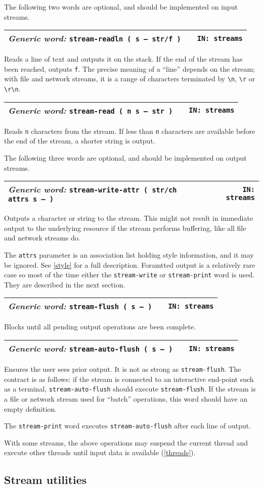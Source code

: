 \documentclass{report}
\newcommand{\genericword}[3]{\index{#1}
\emph{Generic word:} \texttt{#2} &&\texttt{IN: #3}}
\newcommand{\wordtable}[1]{

\begin{tabularx}{12cm}[t]{lXr}
\hline
#1\\
\hline
\end{tabularx}

}
\begin{document}
The following two words are optional, and should be implemented on input streams.
\wordtable{
\genericword{stream-readln}{stream-readln ( s -- str/f )}{streams}
}
Reads a line of text and outputs it on the stack. If the end of the stream has been reached, outputs \texttt{f}. The precise meaning of a ``line'' depends on the stream; with file and network streams, it is a range of characters terminated by \verb|\n|, \verb|\r| or \verb|\r\n|.
\wordtable{
\genericword{stream-read}{stream-read ( n s -- str )}{streams}
}
Reads \texttt{n} characters from the stream. If less than \texttt{n} characters are available before the end of the stream, a shorter string is output.

The following three words are optional, and should be implemented on output streams.

\wordtable{
\genericword{stream-write-attr}{stream-write-attr ( str/ch attrs s -- )}{streams}
}
Outputs a character or string to the stream. This might not result in immediate output to the underlying resource if the stream performs buffering, like all file and network streams do. 

The \texttt{attrs} parameter is an association list holding style information, and it may be ignored. See \ref{style} for a full description. Foramtted output is a relatively rare case so most of the time either the \texttt{stream-write} or \texttt{stream-print} word is used. They are described in the next section.

\wordtable{
\genericword{stream-flush}{stream-flush ( s -- )}{streams}
}
Blocks until all pending output operations are been complete.
\wordtable{
\genericword{stream-auto-flush}{stream-auto-flush ( s -- )}{streams}
}
Ensures the user sees prior output. It is not as strong as \texttt{stream-flush}. The contract is as follows: if the stream is connected to an interactive end-point such as a terminal, \texttt{stream-auto-flush} should execute \texttt{stream-flush}. If the stream is a file or network stream used for ``batch'' operations, this word should have an empty definition.

The \texttt{stream-print} word executes \texttt{stream-auto-flush} after each line of output.

With some streams, the above operations may suspend the current thread and execute other threads until input data is available (\ref{threads}).

\subsection{Stream utilities}
\end{document}
